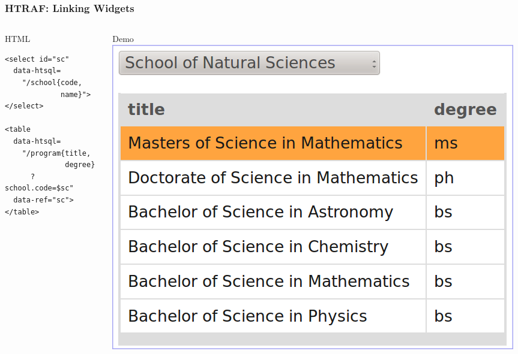 \documentclass{beamer}
\begin{document}
\begin{frame}[containsverbatim]
\frametitle{HTRAF: Linking Widgets}
\begin{columns}[c]
\begin{column}[T]{.5\textwidth}
\begin{block}{HTML}
\small
\begin{lstlisting}
<select id="sc"
  data-htsql=
    "/school{code,
             name}">
</select>

<table
  data-htsql=
    "/program{title,
              degree}
      ?school.code=$sc"
  data-ref="sc">
</table>
\end{lstlisting}
\end{block}
\end{column}
\begin{column}[T]{.5\textwidth}
\begin{block}{Demo}
\includegraphics[width=\textwidth]{img/htraf-4.png}
\end{block}
\end{column}
\end{columns}
\end{frame}
\end{document}
